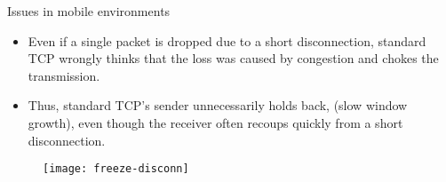 \begin{frame}{Issues in mobile environments}
	\begin{itemize}
		\item Even if a single packet is dropped due to a short disconnection,
		      standard TCP wrongly thinks that the loss was caused by
		      congestion and chokes the transmission.
		\item Thus, standard TCP's sender unnecessarily holds back,
		      (slow window growth), even
		      though the receiver often recoups quickly from a
                      short disconnection.
	\end{itemize}

	\begin{figure}
                \centering\texttt{[image: freeze-disconn]}
        \end{figure}

\end{frame}
